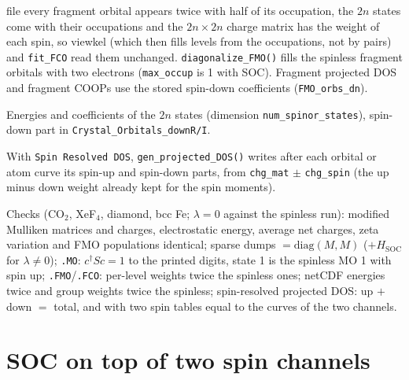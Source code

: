 \documentclass[11pt,a4paper]{article}
\newcommand{\file}[1]{\texttt{#1}}
\newcommand{\fn}[1]{\texttt{#1()}}
\newcommand{\var}[1]{\texttt{#1}}
\newcommand{\Hsoc}{H_{\mathrm{SOC}}}
\begin{document}
\begin{description}[style=nextline,leftmargin=1.2em]
  file every fragment orbital appears twice with half of its occupation, the $2n$ states
  come with their occupations and the $2n\times2n$ charge matrix has the weight of each
  spin, so viewkel (which then fills levels from the occupations, not by pairs) and
  \file{fit\_FCO} read them unchanged. \fn{diagonalize\_FMO} fills the spinless fragment
  orbitals with two electrons (\var{max\_occup} is 1 with SOC). Fragment projected DOS and
  fragment COOPs use the stored spin-down coefficients (\var{FMO\_orbs\_dn}).
\item[netCDF] Energies and coefficients of the $2n$ states (dimension
  \texttt{num\_spinor\_states}), spin-down part in \texttt{Crystal\_Orbitals\_downR/I}.
\item[Spin-resolved projected DOS] With \texttt{Spin Resolved DOS}, \fn{gen\_projected\_DOS}
  writes after each orbital or atom curve its spin-up and spin-down parts, from
  \var{chg\_mat} $\pm$ \var{chg\_spin} (the up minus down weight already kept for the spin
  moments).
\end{description}
Checks (CO$_2$, XeF$_4$, diamond, bcc Fe; $\lambda=0$ against the spinless run): modified
Mulliken matrices and charges, electrostatic energy, average net charges, zeta variation and
FMO populations identical; sparse dumps $=\mathrm{diag}(M,M)$ ($+\Hsoc$ for $\lambda\ne0$);
\texttt{.MO}: $c^\dagger Sc=1$ to the printed digits, state 1 is the spinless MO 1 with spin
up; \texttt{.FMO}/\texttt{.FCO}: per-level weights twice the spinless ones; netCDF energies
twice and group weights twice the spinless; spin-resolved projected DOS: up $+$ down $=$
total, and with two spin tables equal to the curves of the two channels.

\section{SOC on top of two spin channels}\label{sec:socspin}
\end{document}
